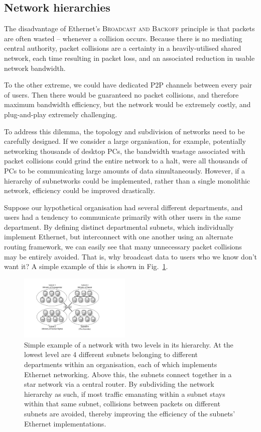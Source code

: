 %
%

\subsection{Network hierarchies} 

The disadvantage of Ethernet's \textsc{Broadcast and Backoff} principle is that packets are often wasted -- whenever a collision occurs. Because there is no mediating central authority, packet collisions are a certainty in a heavily-utilised shared network, each time resulting in packet loss, and an associated reduction in usable network bandwidth.

To the other extreme, we could have dedicated P2P channels between every pair of users. Then there would be guaranteed no packet collisions, and therefore maximum bandwidth efficiency, but the network would be extremely costly, and plug-and-play extremely challenging.

To address this dilemma, the topology and subdivision of networks need to be carefully designed. If we consider a large organisation, for example, potentially networking thousands of desktop PCs, the bandwidth wastage associated with packet collisions could grind the entire network to a halt, were all thousands of PCs to be communicating large amounts of data simultaneously. However, if a hierarchy of subnetworks could be implemented, rather than a single monolithic network, efficiency could be improved drastically.

Suppose our hypothetical organisation had several different departments, and users had a tendency to communicate primarily with other users in the same department. By defining distinct departmental subnets, which individually implement Ethernet, but interconnect with one another using an alternate routing framework, we can easily see that many unnecessary packet collisions may be entirely avoided. That is, why broadcast data to users who we know don't want it? A simple example of this is shown in Fig.~\ref{fig:net_hierarchy}.

\begin{figure}[!htbp]
	\includegraphics[width=0.475\textwidth]{network_hierarchy}
	\captionspacefig \caption{Simple example of a network with two levels in its hierarchy. At the lowest level are 4 different subnets belonging to different departments within an organisation, each of which implements Ethernet networking. Above this, the subnets connect together in a star network via a central router. By subdividing the network hierarchy as such, if most traffic emanating within a subnet stays within that same subnet, collisions between packets on different subnets are avoided, thereby improving the efficiency of the subnets' Ethernet implementations.} \label{fig:net_hierarchy}
\end{figure}

